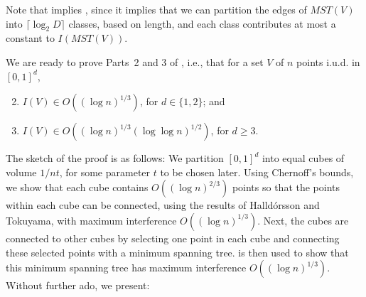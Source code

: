 \documentclass{patmorin}
\newcommand{\mst}{\mathit{MST}}
\begin{document}
Note that  implies , since it implies that we
can partition the edges of $\mst(V)$ into $\lceil\log_2 D\rceil$ classes,
based on length, and each class contributes at most a constant to $I(\mst(V))$.

We are ready to prove Parts~2 and 3 of , i.e., that for a set $V$
 of $n$ points i.u.d. in $[0,1]^d$,
\begin{enumerate}
  \setcounter{enumi}{1}
  \item  $I(V)\in O((\log n)^{1/3})$, for $d\in\{1,2\}$; and 
  \item $I(V)\in O((\log n)^{1/3}(\log\log n)^{1/2})$, for $d\ge 3$.
\end{enumerate}
The sketch of the
proof is as follows:  We partition $[0,1]^d$ into equal cubes of volume
$1/nt$, for some parameter $t$ to be chosen later.  Using Chernoff's
bounds, we show that each cube contains $O((\log n)^{2/3})$ points so
that the points within each cube can be connected, using the results of
Halld\'orsson and Tokuyama, with maximum interference $O((\log n)^{1/3})$.
Next, the cubes are connected to other cubes by selecting one point in
each cube and connecting these selected points with a minimum spanning
tree.   is then used to show that this minimum spanning
tree has maximum interference $O((\log n)^{1/3})$.  Without further ado,
we present:
\end{document}
